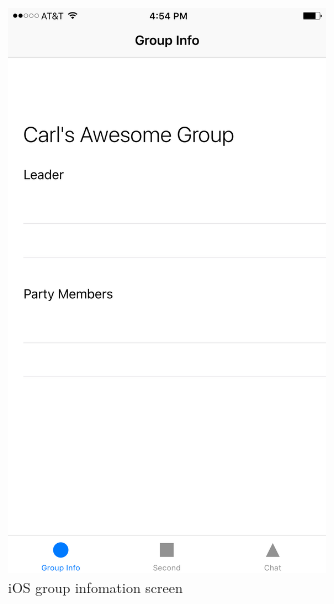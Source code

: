 	\begin{figure}[tbh]
	\begin{center}
	\includegraphics[width=0.75\textwidth]{iOSPictures/img_3898.png}
	\end{center}
	\caption{iOS group infomation screen \label{iOSGroupScreen}}
	\end{figure}

